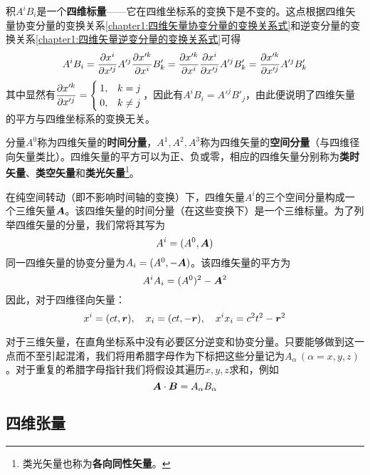 积$A^iB_i$是一个{\bf 四维标量}——它在四维坐标系的变换下是不变的。这点根据四维矢量协变分量的变换关系\eqref{chapter1:四维矢量协变分量的变换关系式}和逆变分量的变换关系\eqref{chapter1:四维矢量逆变分量的变换关系式}可得
\begin{equation*}
	A^iB_i = \frac{\partial x^i}{\partial x'^j} A'^j \frac{\partial x'^k}{\partial x^i} B'_k = \frac{\partial x'^k}{\partial x^i} \frac{\partial x^i}{\partial x'^j} A'^j B'_k = \frac{\partial x'^k}{\partial x'^j} A'^jB'_k
\end{equation*}
其中显然有$\dfrac{\partial x'^k}{\partial x'^j} = \begin{cases} 1, & k=j \\ 0, & k\neq j \end{cases}$，因此有$A^iB_i = A'^jB'_j$，由此便说明了四维矢量的平方与四维坐标系的变换无关。

分量$A^0$称为四维矢量的{\bf 时间分量}，$A^1,A^2,A^3$称为四维矢量的{\bf 空间分量}（与四维径向矢量类比）。四维矢量的平方可以为正、负或零，相应的四维矢量分别称为{\bf 类时矢量}、{\bf 类空矢量}和{\bf 类光矢量}\footnote{类光矢量也称为{\bf 各向同性矢量}。}。

在纯空间转动（即不影响时间轴的变换）下，四维矢量$A^i$的三个空间分量构成一个三维矢量$\boldsymbol{A}$。该四维矢量的时间分量（在这些变换下）是一个三维标量。为了列举四维矢量的分量，我们常将其写为
\begin{equation*}
	A^i = (A^0,\boldsymbol{A})
\end{equation*}
同一四维矢量的协变分量为$A_i=(A^0,-\boldsymbol{A})$。该四维矢量的平方为
\begin{equation*}
	A^iA_i = (A^0)^2 - \boldsymbol{A}^2
\end{equation*}
因此，对于四维径向矢量：
\begin{equation*}
	x^i = (ct,\boldsymbol{r}),\quad x_i = (ct,-\boldsymbol{r}),\quad x^ix_i = c^2t^2- \boldsymbol{r}^2
\end{equation*}

对于三维矢量，在直角坐标系中没有必要区分逆变和协变分量。只要能够做到这一点而不至引起混淆，我们将用希腊字母作为下标把这些分量记为$A_\alpha\,(\alpha=x,y,z)$。对于重复的希腊字母指针我们将假设其遍历$x,y,z$求和，例如
\begin{equation*}
	\boldsymbol{A} \cdot \boldsymbol{B} = A_\alpha B_\alpha
\end{equation*}

\subsection{四维张量}

